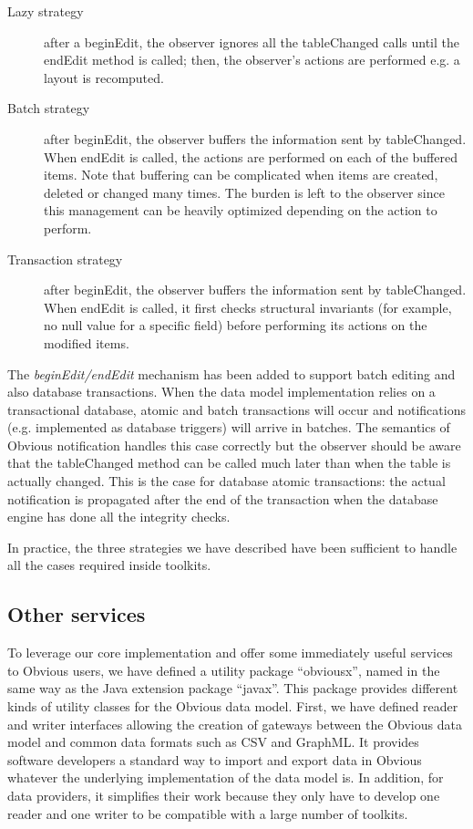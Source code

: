 \begin{description}
\item[Lazy strategy] after a beginEdit, the observer ignores all the
  tableChanged calls until the endEdit method is called; then, the
  observer's actions are performed e.g. a layout is recomputed.

\item[Batch strategy] after beginEdit, the observer buffers the
  information sent by tableChanged.  When endEdit is called, the
  actions are performed on each of the buffered items.  Note that 
  buffering can be complicated when items are created, deleted or
  changed many times.  The burden is left to the observer since this
  management can be heavily optimized depending on the action to
  perform.

\item[Transaction strategy] after beginEdit, the observer buffers the
  information sent by tableChanged.  When endEdit is called, it first
  checks structural invariants (for example, no null value for a
  specific field) before performing its actions on the modified items.
\end{description}

The \emph{beginEdit/endEdit} mechanism has been added to support batch
editing and also database transactions.  When the data model
implementation relies on a transactional database, atomic and batch
transactions will occur and notifications (e.g. implemented as
database triggers) will arrive in batches.  The semantics of Obvious
notification handles this case correctly but the observer should be
aware that the tableChanged method can be called much later than when
the table is actually changed.  This is the case for database atomic
transactions: the actual notification is propagated after the end of
the transaction when the database engine has done all the integrity
checks.

In practice, the three strategies we have described have been
sufficient to handle all the cases required inside toolkits.


\subsection{Other services}

To leverage our core implementation and offer some immediately useful
services to Obvious users, we have defined a utility package
``obviousx'', named in the same way as the Java extension package
``javax''.  This package provides different kinds of utility classes
for the Obvious data model.  First, we have defined reader and writer
interfaces allowing the creation of gateways between the Obvious data
model and common data formats such as CSV and GraphML.  It provides
software developers a standard way to import and export data in
Obvious whatever the underlying implementation of the data model
is.  In addition, for data providers, it simplifies their work because
they only have to develop one reader and one writer to be compatible
with a large number of toolkits.

